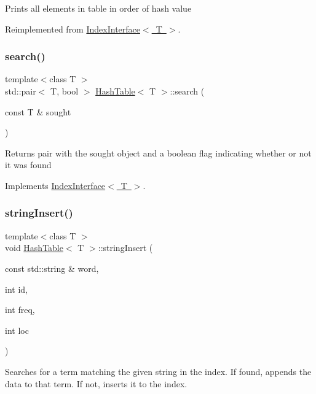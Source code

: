 Prints all elements in table in order of hash value 

Reimplemented from \mbox{\hyperlink{classIndexInterface}{Index\+Interface$<$ T $>$}}.

\mbox{\label{classHashTable_abcc2c56c62a636f9163d934aa6881c57}} 
\subsubsection{\texorpdfstring{search()}{search()}}
{\footnotesize\ttfamily template$<$class T $>$ \\
std\+::pair$<$ T, bool $>$ \mbox{\hyperlink{classHashTable}{Hash\+Table}}$<$ T $>$\+::search (\begin{DoxyParamCaption}\item[{const T \&}]{sought }\end{DoxyParamCaption})\hspace{0.3cm}{\ttfamily [virtual]}}

Returns pair with the sought object and a boolean flag indicating whether or not it was found 

Implements \mbox{\hyperlink{classIndexInterface}{Index\+Interface$<$ T $>$}}.

\mbox{\label{classHashTable_a48094fe05d264dcc5f2292b8ca7e2a4c}} 
\subsubsection{\texorpdfstring{string\+Insert()}{stringInsert()}}
{\footnotesize\ttfamily template$<$class T $>$ \\
void \mbox{\hyperlink{classHashTable}{Hash\+Table}}$<$ T $>$\+::string\+Insert (\begin{DoxyParamCaption}\item[{const std\+::string \&}]{word,  }\item[{int}]{id,  }\item[{int}]{freq,  }\item[{int}]{loc }\end{DoxyParamCaption})\hspace{0.3cm}{\ttfamily [virtual]}}

Searches for a term matching the given string in the index. If found, appends the data to that term. If not, inserts it to the index. 

